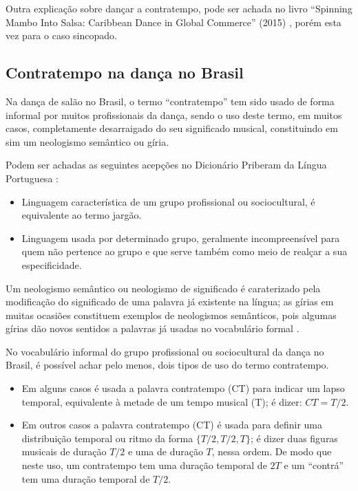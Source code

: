 Outra explicação sobre dançar a contratempo, pode ser achada
no livro ``Spinning Mambo Into Salsa: Caribbean Dance in Global Commerce'' (2015) \cite[pp. 68]{mcmains2015spinning},
porém esta vez para o caso sincopado. 


\subsection{Contratempo na dança no Brasil}
\label{subsec:contratempobrasil}
Na dança de salão no Brasil, 
o termo ``contratempo'' tem sido usado de forma informal por muitos profissionais da dança,
sendo o uso deste termo, em muitos casos, completamente desarraigado do seu significado musical,
constituindo em sim um neologismo semântico ou gíria.

\begin{definition}[Gíria:] 
\label{def:Giria}
Podem ser achadas as seguintes acepções no Dicionário Priberam da Língua Portuguesa \cite{priberamgiria}:
\begin{itemize}
\item Linguagem característica de um grupo profissional ou sociocultural, é equivalente ao termo jargão.
\item Linguagem usada por determinado grupo, 
geralmente incompreensível para quem não pertence ao grupo e que serve também como meio de realçar a sua especificidade.
\end{itemize}
\end{definition}

\begin{definition} 
\label{def:NeologismoSemantico}
Um neologismo semântico ou neologismo de significado é caraterizado pela modificação 
do significado de uma palavra já existente na língua;
as gírias em muitas ocasiões constituem exemplos de neologismos semânticos, 
pois algumas gírias dão novos sentidos a palavras já usadas no vocabulário formal \cite[pp. 82-83]{correalingua}.
\end{definition}

No vocabulário informal do grupo profissional ou sociocultural da dança no Brasil,
é possível achar pelo menos, dois tipos de uso do termo contratempo.
\begin{itemize}
\item Em alguns casos é usada a palavra contratempo (CT) para indicar um lapso temporal, 
equivalente à metade de um tempo musical (T); é dizer: $CT=T/2$.
\item Em outros casos a palavra contratempo (CT) é usada para definir uma distribuição temporal 
ou ritmo da forma $\{T/2, T/2, T\}$; é dizer duas figuras musicais de duração $T/2$ e uma de duração $T$,
nessa ordem. De modo que neste uso, um contratempo tem uma duração temporal de $2T$
e um ``contrá'' tem uma duração temporal de $T/2$. 
\end{itemize}

